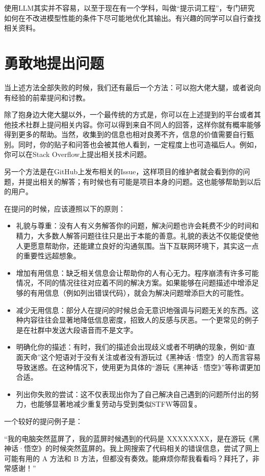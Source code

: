 \documentclass[../main.tex]{subfiles}
\begin{document}
使用LLM其实并不容易，以至于现在有一个学科，叫做“提示词工程”，专门研究如何在不改进模型性能的条件下尽可能地优化其输出。有兴趣的同学可以自行查找相关资料。

\section{勇敢地提出问题}

当上述方法全部失败的时候，我们还有最后一个方法：可以抱大佬大腿，或者说向有经验的前辈提问和讨教。

除了抱身边大佬大腿以外，一个最传统的方式是，你可以在上述提到的平台或者其他技术社群上提问相关内容。你可以得到来自不同人的回答，这样你就有概率能够得到更多的帮助。当然，收集到的信息也相对良莠不齐，信息的价值需要自行甄别。同时，你的贴子和问答也会被其他人看到，一定程度上也可造福后人。例如，你可以在Stack Overflow上提出相关技术问题。

另一个方法是在GitHub上发布相关的Issue，这样项目的维护者就会看到你的问题，并提出相关的解答；有时候也有可能是项目本身的问题。这也能够帮助到以后的用户。

在提问的时候，应该遵照以下的原则：

\begin{itemize}
    \item 礼貌与尊重：没有人有义务解答你的问题，解决问题也许会耗费不少的时间和精力，大多数人解答问题往往只是出于本能的善意。礼貌的表达不仅能促使他人更愿意帮助你，还能建立良好的沟通氛围。当下互联网环境下，其实这一点的重要性远超想象。
    \item 增加有用信息：缺乏相关信息会让帮助你的人有心无力。程序崩溃有许多可能情况，不同的情况往往对应着不同的解决方案。如果能够在问题描述中增添足够的有用信息（例如列出错误代码），就会为解决问题增添巨大的可能性。
    \item 减少无用信息：部分人在提问的时候总会无意识地强调与问题无关的东西。这种内容往往会显著地降低信息密度，招致人的反感与厌恶。一个更常见的例子是在社群中发送大段语音而不是文字。
    \item 明确化你的描述：有时，我们的描述会出现歧义或者不明确的现象，例如“直面天命”这个短语对于没有关注或者没有游玩过《黑神话·悟空》的人而言容易导致迷惑。在这种情况下，使用更为具体的“游玩《黑神话·悟空》”等称谓更加合适。
    \item 列出你失败的尝试：这不仅表现出你为了自己解决自己遇到的问题所付出的努力，也能够显著地减少重复劳动与受到类似STFW等回复。
\end{itemize}

一个较好的提问例子是：

“我的电脑突然蓝屏了，我的蓝屏时候遇到的代码是 XXXXXXXX，是在游玩《黑神话·悟空》的时候突然蓝屏的。我上网搜索了代码相关的错误信息，尝试了网上可能有用的 A 方法和 B 方法，但都没有奏效。能麻烦你帮我看看吗？拜托了，非常感谢！”
\end{document}
